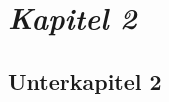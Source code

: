 \chapter{\textit{Kapitel 2}}
\label{chap:Kapitel-2}
\section{Unterkapitel 2}
\label{sec:unterkapitel-2}
